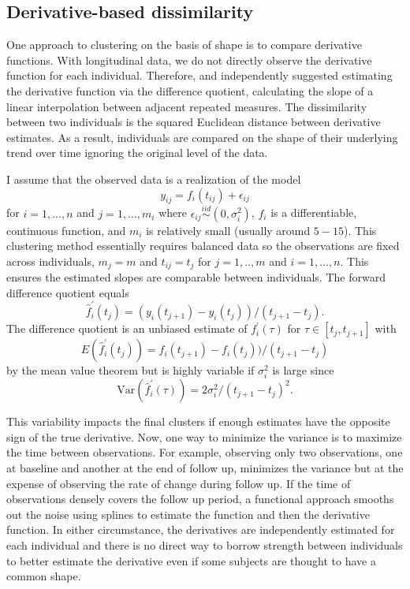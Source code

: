\subsection{Derivative-based dissimilarity}
One approach to clustering on the basis of shape is to compare derivative functions. With longitudinal data, we do not directly observe the derivative function for each individual. Therefore, \textcite{moller2003} and \textcite{d2000} independently suggested estimating the derivative function via the difference quotient, calculating the slope of a linear interpolation between adjacent repeated measures. The dissimilarity between two individuals is the squared Euclidean distance between derivative estimates. As a result, individuals are compared on the shape of their underlying trend over time ignoring the original level of the data. 

I assume that the observed data is a realization of the model
$$y_{ij}= f_i(t_{ij})+\epsilon_{ij}$$
for $i=1,...,n$ and $j=1,...,m_{i}$ where $\epsilon_{ij}\overset{iid}{\sim} (0,\sigma_{i}^{2})$, $f_{i}$ is a differentiable, continuous function, and $m_{i}$ is relatively small (usually around $5-15$). This clustering method essentially requires balanced data so the observations are fixed across individuals, $m_{j}=m$ and $t_{ij} = t_{j}$ for $j=1,..,m$ and $i=1,...,n$. This ensures the estimated slopes are comparable between individuals. The forward difference quotient equals 
$$\hat{f}_{i}^{'}(t_{j}) = (y_i(t_{j+1})-y_i(t_j))/(t_{j+1}-t_j).$$
The difference quotient is an unbiased estimate of $f_{i}^{'}(\tau)$ for $\tau\in[t_{j},t_{j+1}]$ with
$$E(\hat{f}_{i}^{'}(t_{j})) = f_i(t_{j+1})-f_i(t_j))/(t_{j+1}-t_j)$$
by the mean value theorem but is highly variable if $\sigma_{i}^{2}$ is large since
$$\text{Var}(\hat{f}_{i}^{'}(\tau)) =  2\sigma^{2}_{i}/ (t_{j+1}-t_j)^{2}.$$

This variability impacts the final clusters if enough estimates have the opposite sign of the true derivative. Now, one way to minimize the variance is to maximize the time between observations. For example, observing only two observations, one at baseline and another at the end of follow up, minimizes the variance but at the expense of observing the rate of change during follow up. If the time of observations densely covers the follow up period, a functional approach smooths out the noise using splines to estimate the function and then the derivative function. In either circumstance, the derivatives are independently estimated for each individual and there is no direct way to borrow strength between individuals to better estimate the derivative even if some subjects are thought to have a common shape. 

